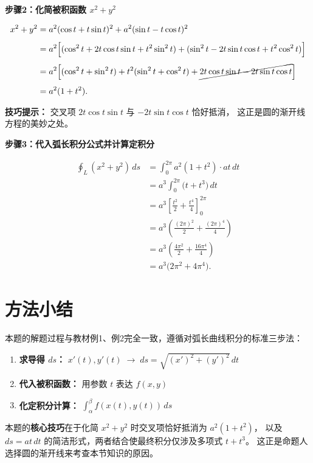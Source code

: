 \documentclass[12pt,a4paper]{ctexart}
\theoremstyle{myremark}
\newcommand{\answerbox}[1]{%
  \begin{center}
  \fbox{\color{red}\large\bfseries #1}
  \end{center}
}
\begin{document}
\medskip

\noindent\textbf{步骤2：化简被积函数 $x^2 + y^2$}

\[
\begin{aligned}
x^2 + y^2 &= a^2(\cos t + t\sin t)^2 + a^2(\sin t - t\cos t)^2 \\[4pt]
          &= a^2\Bigl[(\cos^2 t + 2t\cos t\sin t + t^2\sin^2 t)
                   + (\sin^2 t - 2t\sin t\cos t + t^2\cos^2 t)\Bigr] \\[4pt]
          &= a^2\Bigl[(\cos^2 t + \sin^2 t) + t^2(\sin^2 t + \cos^2 t)
                   + \cancel{2t\cos t\sin t - 2t\sin t\cos t}\Bigr] \\[4pt]
          &= a^2(1 + t^2).
\end{aligned}
\]

\textbf{技巧提示：} 交叉项 $2t\cos t\sin t$ 与 $-2t\sin t\cos t$ 恰好抵消，
这正是圆的渐开线方程的美妙之处。

\medskip

\noindent\textbf{步骤3：代入弧长积分公式并计算定积分}

\[
\begin{aligned}
\oint_L (x^2 + y^2)\, ds
   &= \int_0^{2\pi} a^2(1 + t^2) \cdot a t\, dt \\[4pt]
   &= a^3 \int_0^{2\pi} \bigl(t + t^3\bigr)\, dt \\[4pt]
   &= a^3 \left[ \frac{t^2}{2} + \frac{t^4}{4} \right]_0^{2\pi} \\[4pt]
   &= a^3 \left( \frac{(2\pi)^2}{2} + \frac{(2\pi)^4}{4} \right) \\[4pt]
   &= a^3 \left( \frac{4\pi^2}{2} + \frac{16\pi^4}{4} \right) \\[4pt]
   &= a^3 \bigl( 2\pi^2 + 4\pi^4 \bigr).
\end{aligned}
\]

\bigskip

\answerbox{$\displaystyle \oint_L (x^2 + y^2)\, ds = 2\pi^2 a^3 \bigl(1 + 2\pi^2\bigr)$}

\bigskip

\section*{方法小结}

本题的解题过程与教材例1、例2完全一致，遵循对弧长曲线积分的标准三步法：

\begin{enumerate}[leftmargin=*,itemsep=4pt]
  \item \textbf{求导得 $ds$：} $x'(t),y'(t) \;\to\; ds = \sqrt{(x')^2+(y')^2}\,dt$
  \item \textbf{代入被积函数：} 用参数 $t$ 表达 $f(x,y)$
  \item \textbf{化定积分计算：} $\displaystyle \int_\alpha^\beta f(x(t),y(t))\, ds$
\end{enumerate}

本题的\textbf{核心技巧}在于化简 $x^2+y^2$ 时交叉项恰好抵消为 $a^2(1+t^2)$，
以及 $ds = at\,dt$ 的简洁形式，两者结合使最终积分仅涉及多项式 $t+t^3$。
这正是命题人选择圆的渐开线来考查本节知识的原因。
\end{document}
